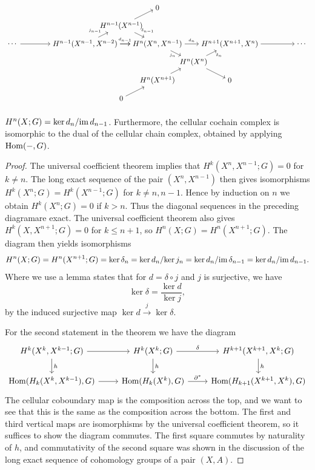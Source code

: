 \[\begin{tikzpicture}[scale=0.85]
\node (0) at (0,0) {$\cdots$};
\node (k0) at (4,0) {$H^{n-1}(X^{n-1},X^{n-2})$};
\node (k1) at (8,0) {$H^{n}(X^{n},X^{n-1})$};
\node (k2) at (12,0) {$H^{n+1}(X^{n+1},X^{n})$};
\node (k3) at (16,0) {$\cdots$};
\node (a1) at (6,1) {$H^{n-1}(X^{n-1})$};
\node (a2) at (8,2) {$0$};
\node (b1) at (10,-1) {$H^{n}(X^{n})$};
\node (b0) at (8,-2) {$H^n(X^{n+1})$};
\node (b2) at (12,-2) {$0$};
\node (b3) at (6,-3) {$0$};
\draw[->]
(0) edge (k0)
(k0) edge (k1)
(k2) edge (k3)
(a1) edge (a2)
(b1) edge (b2)
(b3) edge (b0)
(b0) edge (b1)
(k0) edge node[node font=\tiny,auto] {$d_{n-1}$} (k1)
(k1) edge node[node font=\tiny,auto] {$d_{n}$} (k2)
(k0) edge node[node font=\tiny,auto] {$j_{n-1}$} (a1) 
(a1) edge node[node font=\tiny,auto] {$\delta_{n-1}$} (k1)
(k1) edge node[node font=\tiny,below,pos=0.2] {$j_{n}$} (b1) 
(b1) edge node[node font=\tiny,below,pos=0.8,xshift=6pt] {$\delta_{n}$}(k2);
\end{tikzpicture}\]
\begin{theorem}
$H^n(X;G)=\mathrm{ker}\, d_n/\mathrm{im}\, d_{n-1}$. Furthermore, the cellular cochain complex is isomorphic to the dual of the cellular chain complex, obtained by applying $\mathrm{Hom}(-,G)$.
\end{theorem}
\begin{proof}
The universal coefficient theorem implies that $H^k(X^n,X^{n-1};G)=0$ for $k\neq n$. The long exact sequence of the pair $(X^n,X^{n-1})$ then gives isomorphisms $H^k(X^n;G)=H^k(X^{n-1};G)$ for $k\neq n,n-1$. Hence by induction on $n$ we obtain $H^k(X^n;G)=0$ if $k>n$. Thus the diagonal sequences in the preceding diagramare exact. The universal coefficient theorem also gives $H^k(X,X^{n+1};G)=0$ for $k\leq n+1$, so $H^n(X;G)=H^n(X^{n+1};G)$. The diagram then yields isomorphisms
\[H^n(X;G)=H^n(X^{n+1};G)=\mathrm{ker}\,\delta_n=\mathrm{ker}\, d_n/\mathrm{ker}\, j_{n}=\mathrm{ker}\, d_n/\mathrm{im}\,\delta_{n-1}=\mathrm{ker}\, d_n/\mathrm{im}\, d_{n-1}.\]
Where we use a lemma states that for $d=\delta\circ j$ and $j$ is surjective, we have
\[\ker\delta=\dfrac{\ker d}{\ker j},\]
by the induced surjective map $\ker d\stackrel{j}{\longrightarrow}\ker\delta$.\par
For the second statement in the theorem we have the diagram
\[\begin{tikzcd}
H^k(X^k,X^{k-1};G)\ar[r]\ar[d,"h"]&H^k(X^k;G)\ar[r,"\delta"]\ar[d,"h"]&H^{k+1}(X^{k+1},X^k;G)\ar[d,"h"]\\
\Hom(H_k(X^k,X^{k-1}),G)\ar[r]&\Hom(H_k(X^k),G)\ar[r,"\partial^*"]&\Hom(H_{k+1}(X^{k+1},X^k),G)
\end{tikzcd}\]
The cellular coboundary map is the composition across the top, and we want to see that this is the same as the composition across the bottom. The first and third vertical maps are isomorphisms by the universal coefficient theorem, so it suffices to show the diagram commutes. The first square commutes by naturality of $h$, and commutativity of the second square was shown in the discussion of the long exact sequence of cohomology groups of a pair $(X,A)$.
\end{proof}
